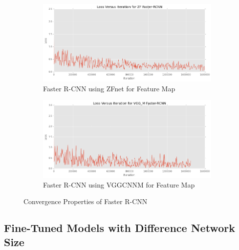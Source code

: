 \begin{figure}[H]
\centering
\begin{subfigure}[t]{.49\textwidth}
    \centering
    \includegraphics[width=1.0\linewidth]{img/FRCNN_zf_cov.png}
    \caption{Faster R-CNN using ZFnet for Feature Map}
\end{subfigure}
\begin{subfigure}[t]{.49\textwidth}
    \centering
    \includegraphics[width=1.0\linewidth]{img/FRCNN_vgg_m_cov.png}
    \caption{Faster R-CNN using VGG\textunderscore CNN\textunderscore M for Feature Map}
\end{subfigure}
\caption{Convergence Properties of Faster R-CNN}
\end{figure}


\subsection{Fine-Tuned Models with Difference Network Size}

